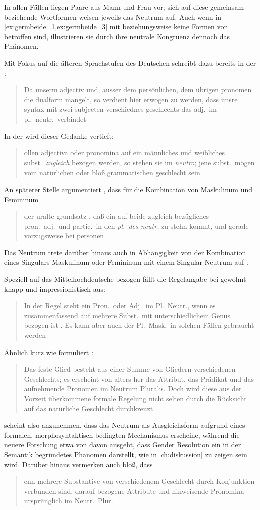 In allen Fällen liegen Paare aus Mann und Frau vor; sich auf diese gemeinsam
beziehende Wortformen weisen jeweils das Neutrum auf. Auch wenn in
\cref{ex:germbeide_1,ex:germbeide_3} mit  
beziehungsweise   keine Formen von
 betroffen sind, illustrieren sie durch ihre neutrale
Kongruenz dennoch das Phänomen.

Mit Fokus auf die älteren Sprachstufen des Deutschen schreibt dazu bereits
\citeauthor{grimm1848} in der :
\blockcquote[978]{grimm1848}{Da unserm adjectiv und, ausser dem
persönlichen, dem übrigen pronomen die dualform mangelt, so verdient hier
erwogen zu werden, dass unsre syntax mit zwei subjecten verschiednes
geschlechts das adj.\ im pl.~neutr.\ verbindet}. In der  wird dieser Gedanke vertieft:
\blockcquote[311--312]{grimm1890}{ollen adjectiva oder pronomina
auf ein männliches und weibliches subst.\ \emph{zugleich} bezogen werden, so
stehen sie im \emph{neutro}; jene subst.\ mögen vom natürlichen oder bloß
grammatischen geschlecht sein}. An späterer Stelle argumentiert
\citeauthor{grimm1898}, dass für die Kombination von Maskulinum und Femininum
\blockcquote[329]{grimm1898}{der uralte grundsatz , daß ein auf
beide zugleich bezügliches pron.\ adj.\ und partic.\ in den \emph{pl.\ des
neutr.} zu stehn kommt, und gerade vorzugsweise bei personen}. Das Neutrum
trete darüber hinaus auch in Abhängigkeit von der Kombination eines Singulars
Maskulinum oder Femininum mit einem Singular Neutrum auf
\autocite[331]{grimm1898}.

Speziell auf das Mittelhochdeutsche bezogen fällt die Regelangabe bei
\citeauthor{paul2007} gewohnt knapp und impressionistisch aus:
\blockcquote[384]{paul2007}{In der Regel steht ein Pron.\ oder Adj.\ im
Pl.~Neutr., wenn es zusammenfassend auf mehrere Subst.\ mit unterschiedlichem
Genus bezogen ist \textelp{}. Es kann aber auch der Pl.~Mask.\ in solchen
Fällen gebraucht werden}. Ähnlich kurz wie \citet{paul2007} formuliert
\citet[39]{behaghel1928}: \blockquote{Das feste Glied besteht aus einer Summe
von Gliedern verschiedenen Geschlechts; es erscheint von alters her das
Attribut, das Prädikat und das aufnehmende Pronomen im Neutrum Pluralis.
\textelp{} Doch wird diese aus der Vorzeit überkommene formale Regelung nicht
selten durch die Rücksicht auf das natürliche Geschlecht durchkreuzt}.

\citet{behaghel1928} scheint also anzunehmen, dass das Neutrum als
Ausgleichsform aufgrund eines formalen, morphosyntaktisch bedingten Mechanismus
erscheine, während die neuere Forschung etwa von
\citet{wechslerzlatic2003,wechsler2009} davon ausgeht, dass Gender Resolution
ein in der Semantik begründetes Phänomen darstellt, wie in \cref{ch:diskussion}
zu zeigen sein wird. Darüber hinaus vermerken auch \citet[188]{dal2014} bloß,
dass \blockquote{enn mehrere Substantive von verschiedenem
Geschlecht durch Konjunktion verbunden sind, \textelp{} darauf bezogene
Attribute und hinweisende Pronomina ursprünglich im Neutr.\ Plur.\
}.

